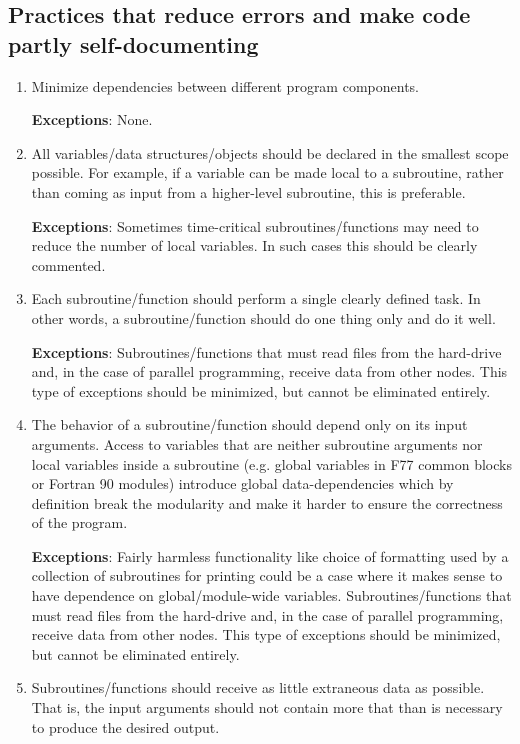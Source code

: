 \documentclass[preprint,aps]{revtex4}
\newcommand \progexception[1] {{\bf Exceptions}: {#1}}
\begin{document}
\subsection{Practices that reduce errors and make code partly self-documenting}

\label{secERRSELFDOC}

\begin{enumerate}
\item Minimize dependencies between different program components.

      \progexception{None.}
\item All variables/data structures/objects should be declared in the
      smallest scope possible. For example, if a variable can be made
      local to a subroutine, rather than coming as input from a
      higher-level subroutine, this is preferable.
      
      \progexception{Sometimes time-critical subroutines/functions may
    need to reduce the number of local variables. In such cases this
    should be clearly commented.}
\item Each subroutine/function should perform a single clearly defined
      task. In other words, a subroutine/function should do one thing
      only and do it well.

      \progexception{Subroutines/functions that must read files from
    the hard-drive and, in the case of parallel programming, receive
    data from other nodes.  This type of exceptions should be
    minimized, but cannot be eliminated entirely.}
\item The behavior of a subroutine/function should depend only on its
    input arguments. Access to variables that are neither subroutine
    arguments nor local variables inside a subroutine (e.g. global
    variables in F77 common blocks or Fortran 90 modules) introduce
    global data-dependencies which by definition break the modularity
    and make it harder to ensure the correctness of the program.

      \progexception{Fairly harmless functionality like choice of
    formatting used by a collection of subroutines for printing could
    be a case where it makes sense to have dependence on
    global/module-wide variables. Subroutines/functions that must read
    files from the hard-drive and, in the case of parallel
    programming, receive data from other nodes.  This type of
    exceptions should be minimized, but cannot be eliminated
    entirely.}
\item \label{ruleMININPUT} Subroutines/functions should receive as
    little extraneous data as possible. That is, the input arguments
    should not contain more that than is necessary to produce the
    desired output.


\end{enumerate}
\end{document}
